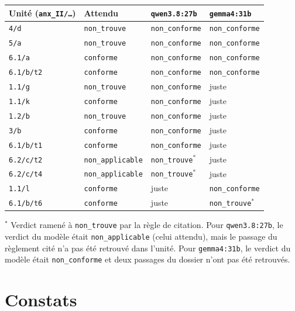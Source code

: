 \documentclass[11pt,a4paper]{article}
\begin{document}
\begin{center}
\begin{tabular}{@{}llll@{}}
\toprule
Unité (\texttt{anx\_II/\ldots}) & Attendu & \texttt{qwen3.8:27b} & \texttt{gemma4:31b} \\
\midrule
\texttt{4/d} & \texttt{non\_trouve} & \texttt{non\_conforme} & \texttt{non\_conforme} \\
\texttt{5/a} & \texttt{non\_trouve} & \texttt{non\_conforme} & \texttt{non\_conforme} \\
\texttt{6.1/a} & \texttt{conforme} & \texttt{non\_conforme} & \texttt{non\_conforme} \\
\texttt{6.1/b/t2} & \texttt{conforme} & \texttt{non\_conforme} & \texttt{non\_conforme} \\
\midrule
\texttt{1.1/g} & \texttt{non\_trouve} & \texttt{non\_conforme} & juste \\
\texttt{1.1/k} & \texttt{conforme} & \texttt{non\_conforme} & juste \\
\texttt{1.2/b} & \texttt{non\_trouve} & \texttt{non\_conforme} & juste \\
\texttt{3/b} & \texttt{conforme} & \texttt{non\_conforme} & juste \\
\texttt{6.1/b/t1} & \texttt{conforme} & \texttt{non\_conforme} & juste \\
\texttt{6.2/c/t2} & \texttt{non\_applicable} & \texttt{non\_trouve}$^{*}$ & juste \\
\texttt{6.2/c/t4} & \texttt{non\_applicable} & \texttt{non\_trouve}$^{*}$ & juste \\
\texttt{1.1/l} & \texttt{conforme} & juste & \texttt{non\_conforme} \\
\texttt{6.1/b/t6} & \texttt{conforme} & juste & \texttt{non\_trouve}$^{*}$ \\
\bottomrule
\end{tabular}
\end{center}

\noindent$^{*}$ Verdict ramené à \texttt{non\_trouve} par la règle de
citation. Pour \texttt{qwen3.8:27b}, le verdict du modèle était
\texttt{non\_applicable} (celui attendu), mais le passage du règlement cité
n'a pas été retrouvé dans l'unité. Pour \texttt{gemma4:31b}, le verdict du
modèle était \texttt{non\_conforme} et deux passages du dossier n'ont pas
été retrouvés.

\section{Constats}
\end{document}

